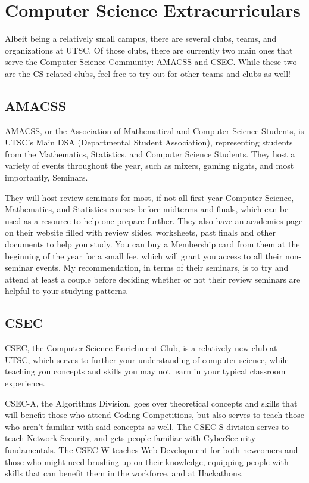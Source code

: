 \documentclass[11pt]{article}
\begin{document}
\section{Computer Science Extracurriculars}
Albeit being a relatively small campus, there are several clubs, teams,
and organizations at UTSC. Of those clubs, there are currently two main
ones that serve the Computer Science Community: AMACSS and CSEC. While
these two are the CS-related clubs, feel free to try out for other teams
and clubs as well!

\subsection{AMACSS}
AMACSS, or the Association of Mathematical and Computer Science
Students, is UTSC's Main DSA (Departmental Student Association),
representing students from the Mathematics, Statistics, and Computer
Science Students. They host a variety of events throughout the year,
such as mixers, gaming nights, and most importantly, Seminars.

They will host review seminars for most, if not all first year Computer
Science, Mathematics, and Statistics courses before midterms and finals,
which can be used as a resource to help one prepare further. They also
have an academics page on their website filled with review slides,
worksheets, past finals and other documents to help you study. You can
buy a Membership card from them at the beginning of the year for a small
fee, which will grant you access to all their non-seminar events. My
recommendation, in terms of their seminars, is to try and attend at
least a couple before deciding whether or not their review seminars are
helpful to your studying patterns.

\subsection{CSEC}
CSEC, the Computer Science Enrichment Club, is a relatively new club at
UTSC, which serves to further your understanding of computer science,
while teaching you concepts and skills you may not learn in your typical
classroom experience.

CSEC-A, the Algorithms Division, goes over theoretical concepts and
skills that will benefit those who attend Coding Competitions, but
also serves to teach those who aren't familiar with said concepts as
well. The CSEC-S division serves to teach Network Security, and gets
people familiar with CyberSecurity fundamentals. The CSEC-W teaches Web
Development for both newcomers and those who might need brushing up on
their knowledge, equipping people with skills that can benefit them in
the workforce, and at Hackathons.
\end{document}
